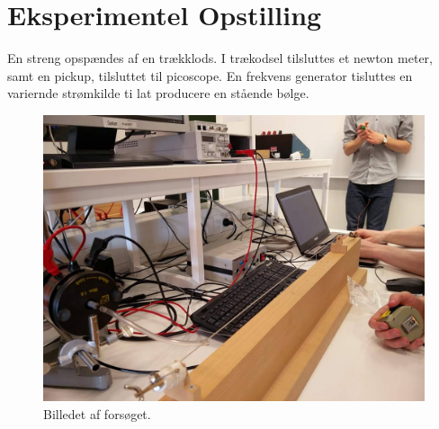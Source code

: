 \documentclass[A2_main.tex]{subfiles}
\begin{document}
\section{Eksperimentel Opstilling}
En streng opspændes af en trækklods. I trækodsel tilsluttes et newton meter, samt en pickup, tilsluttet til picoscope. En frekvens generator tisluttes en variernde strømkilde ti lat producere en stående bølge.
\begin{figure}[H]
    \includegraphics[width=\linewidth]{opstilling.jpg}
    \caption{Billedet af forsøget.}
    \label{fig:opstilling}
\end{figure}
\end{document}
